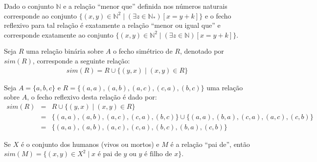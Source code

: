 \begin{exemplo}
	Dado o conjunto $\mathbb{N}$ e a relação ``menor que'' definida nos números naturais corresponde ao conjunto $\{(x, y) \in \mathbb{N}^2 \mid (\exists z \in \mathbb{N}_*)[x = y + k]\}$ e o fecho reflexivo para tal relação é exatamente a relação ``menor ou igual que'' e corresponde exatamente ao conjunto $\{(x, y) \in \mathbb{N}^2 \mid (\exists z \in \mathbb{N})[x = y + k]\}$.
\end{exemplo}

\begin{definicao}\label{def:FechoSimetrico}
	Seja $R$ uma relação binária sobre $A$ o fecho simétrico de $R$, denotado por $sim(R)$, corresponde a seguinte relação:
	\begin{eqnarray*}
		sim(R) = R \cup \{(y, x) \mid (x, y) \in R\}
	\end{eqnarray*}
\end{definicao}

\begin{exemplo}
	Seja $A = \{a, b, c\}$ e $R = \{(a, a), (a, b), (a, c), (c, a), (b, c)\}$ uma relação sobre $A$,  o fecho reflexivo desta relação é dado por:
	\begin{eqnarray*}
		sim(R) & = &   R \cup \{(y, x) \mid (x, y) \in R\}\\
		& = &  \{(a, a), (a, b), (a, c), (c, a), (b, c)\} \cup \{(a, a), (b, a), (c, a), (a, c), (c, b)\}\\
		& = & \{(a, a), (a, b), (a, c), (c, a), (b, c), (b, a), (c, b)\}
	\end{eqnarray*}
\end{exemplo}

\begin{exemplo}
	Se $X$ é o conjunto dos humanos (vivos ou mortos) e $M$ é a relação ``pai de'', então $sim(M) = \{(x, y) \in X^2 \mid x \text{ é pai de } y \text{ ou } y \text{ é filho de } x\}$.
\end{exemplo}


